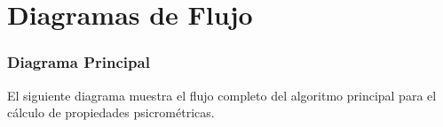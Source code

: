 \documentclass[12pt, oneside]{book}
\begin{document}
    \sloppy
    \frontmatter
    \newpage
    \renewcommand\contentsname{\large Índice General}           %
    \thispagestyle{plain}                                       %
    \tableofcontents
    \setcounter{tocdepth}{2}
    
    
    
    
    \ifx\generatoc\undefined
    \else
    
    \fi
    \mainmatter     %
    \restauraCabecera
    
    \printglossary[type=\acronymtype, title={Lista de Acrónimos y Siglas}]

    \newpage
        
    
    
     
    
    
    
    
    

    
    \section{Diagramas de Flujo}

    \subsubsection{Diagrama Principal}
    \label{sec:flowchart_main}

    El siguiente diagrama muestra el flujo completo del algoritmo principal para el cálculo de propiedades psicrométricas.
\end{document}
